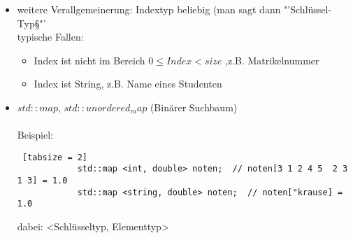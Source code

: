 \documentclass{article}
\begin{document}
\begin{itemize}
\begin{lstlisting} [tabsize = 2]
	 		std::vector <double> v(20, 0.0) ;  // initialisiert mit Groesse, Initialwert
	 		
	 		// analog: std::vector<int>, std::vector<std::string>
	 	\end{lstlisting}
	 	Abbildung: $int \rightarrowtail double$
	 	
	 	\item weitere Verallgemeinerung: Indextyp beliebig (man sagt dann "'Schlüssel-Typ§"' \\
	 	typische Fallen:
	 	\begin{itemize}
	 		\item Index ist nicht im Bereich $0 \leq Index < size$ ,z.B. Matrikelnummer
	 		\item Index ist String, z.B. Name eines Studenten
	 	\end{itemize}
	 	\item $std::map, \, std::unordered_map$ (Binärer Suchbaum) \\ \\
	 	 Beispiel:
	 	 \begin{lstlisting} [tabsize = 2]
	 	 	std::map <int, double> noten;  // noten[3 1 2 4 5  2 3 1 3] = 1.0
	 	 	std::map <string, double> noten;  // noten["krause] = 1.0
	 	 \end{lstlisting}
	 	 dabei: <Schlüsseltyp, Elementtyp>
	 \end{itemize}
	 
\end{document}
